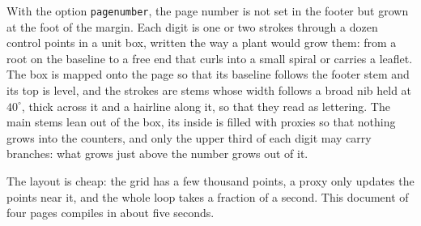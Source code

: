 \begin{remark}
With the option \texttt{pagenumber}, the page number is not set in the footer but grown at
the foot of the margin. Each digit is one or two strokes through a dozen control points in
a unit box, written the way a plant would grow them: from a root on the baseline to a free
end that curls into a small spiral or carries a leaflet. The box is mapped onto the page so
that its baseline follows the footer stem and its top is level, and the strokes are stems
whose width follows a broad nib held at $40^\circ$, thick across it and a hairline along
it, so that they read as lettering. The main stems lean out of the box, its inside is
filled with proxies so that nothing grows into the counters, and only the upper third of
each digit may carry branches: what grows just above the number grows out of it.
\end{remark}

\begin{remark}[Cost]
The layout is cheap: the grid has a few thousand points, a proxy only updates the points
near it, and the whole loop takes a fraction of a second. This document of four pages
compiles in about five seconds.
\end{remark}
